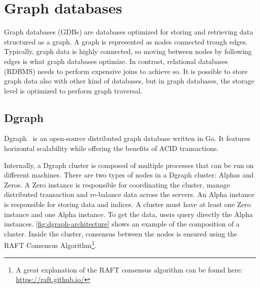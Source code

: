 \section{Graph databases}

Graph databases (GDBs) are databases optimized for storing and retrieving data structured as a graph. A graph is represented as nodes connected trough edges. Typically, graph data is highly connected, so moving between nodes by following edges is what graph databases optimize. In contrast, relational databases (RDBMS) needs to perform expensive joins to achieve so. It is possible to store graph data also with other kind of databases, but in graph databases, the storage level is optimized to perform graph traversal. 

\subsection{Dgraph}

Dgraph~\cite{dgraph} is an open-source distributed graph database written in Go. It features horizontal scalability while offering the benefits of ACID transactions.

Internally, a Dgraph cluster is composed of multiple processes that can be run on different machines. There are two types of nodes in a Dgraph cluster: Alphas and Zeros. A Zero instance is responsible for coordinating the cluster, manage distributed transaction and re-balance data across the servers. An Alpha instance is responsible for storing data and indices. A cluster must have at least one Zero instance and one Alpha instance. To get the data, users query directly the Alpha instances. \cref{fig:dgraph-architecture} shows an example of the composition of a cluster. Inside the cluster, consensus between the nodes is ensured using the RAFT Consensus Algorithm\footnote{A great explanation of the RAFT consensus algorithm can be found here: \url{https://raft.github.io/}}.

